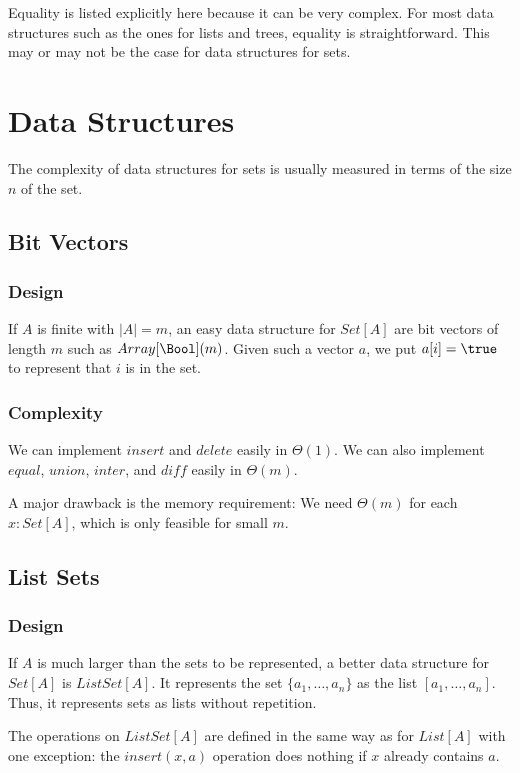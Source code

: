 Equality is listed explicitly here because it can be very complex.
For most data structures such as the ones for lists and trees, equality is straightforward.
This may or may not be the case for data structures for sets.

\section{Data Structures}

The complexity of data structures for sets is usually measured in terms of the size $n$ of the set.

\subsection{Bit Vectors}\label{sec:ad:vectorset}

\subsubsection{Design}
If $A$ is finite with $|A|=m$, an easy data structure for $Set[A]$ are bit vectors of length $m$ such as $Array[\Bool](m)$.
Given such a vector $a$, we put $a[i]=\true$ to represent that $i$ is in the set.

\subsubsection{Complexity}
We can implement $insert$ and $delete$ easily in $\Theta(1)$.
We can also implement $equal$, $union$, $inter$, and $\mathit{diff}$ easily in $\Theta(m)$.

A major drawback is the memory requirement: We need $\Theta(m)$ for each $x:Set[A]$, which is only feasible for small $m$.

\subsection{List Sets}\label{sec:ad:listset}

\subsubsection{Design}
If $A$ is much larger than the sets to be represented, a better data structure for $Set[A]$ is $ListSet[A]$.
It represents the set $\{a_1,\ldots,a_n\}$ as the list $[a_1,\ldots,a_n]$.
Thus, it represents sets as lists without repetition.

The operations on $ListSet[A]$ are defined in the same way as for $List[A]$ with one exception: the $insert(x,a)$ operation does nothing if $x$ already contains $a$.

